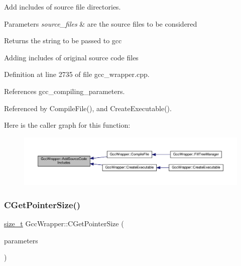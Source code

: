 Add includes of source file directories. 


\begin{DoxyParams}{Parameters}
{\em source\+\_\+files} & are the source files to be considered \\
\hline
\end{DoxyParams}
\begin{DoxyReturn}{Returns}
the string to be passed to gcc 
\end{DoxyReturn}
Adding includes of original source code files 

Definition at line 2735 of file gcc\+\_\+wrapper.\+cpp.



References gcc\+\_\+compiling\+\_\+parameters.



Referenced by Compile\+File(), and Create\+Executable().

Here is the caller graph for this function\+:
\nopagebreak
\begin{figure}[H]
\begin{center}
\leavevmode
\includegraphics[width=350pt]{d4/dbf/classGccWrapper_a7adb23681d3cc41de3bd7063ec636de7_icgraph}
\end{center}
\end{figure}
\mbox{\label{classGccWrapper_abc1a0fb1d8c8bd5d9cac9ac120a8f2b2}} 
\subsubsection{\texorpdfstring{C\+Get\+Pointer\+Size()}{CGetPointerSize()}}
{\footnotesize\ttfamily \hyperlink{tutorial__fpt__2017_2intro_2sixth_2test_8c_a7c94ea6f8948649f8d181ae55911eeaf}{size\+\_\+t} Gcc\+Wrapper\+::\+C\+Get\+Pointer\+Size (\begin{DoxyParamCaption}\item[{const \hyperlink{Parameter_8hpp_a37841774a6fcb479b597fdf8955eb4ea}{Parameter\+Const\+Ref}}]{parameters }\end{DoxyParamCaption})\hspace{0.3cm}{\ttfamily [static]}}



